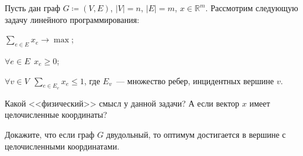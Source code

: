 Пусть дан граф $G \coloneqq (V, E)$, $|V| = n$, $|E| = m$, $x \in \mathbb{R}^m$. Рассмотрим следующую
задачу линейного программирования:
\begin{itemtask}
    \item $\sum\limits_{e \in E} x_e \rightarrow \max$;
    \item $\forall e \in E ~~ x_e \ge 0$;
    \item $\forall v \in V ~~ \sum\limits_{e \in E_v} x_e \le 1$, где $E_v$~--- множество ребер,
        инцидентных вершине $v$.        
\end{itemtask}

\begin{enumcyr}
	\item Какой <<физический>> смысл у данной задачи? А если вектор $x$ имеет целочисленные координаты?
    \item Докажите, что если граф $G$ двудольный, то оптимум достигается в вершине с целочисленными
	    координатами.
\end{enumcyr}